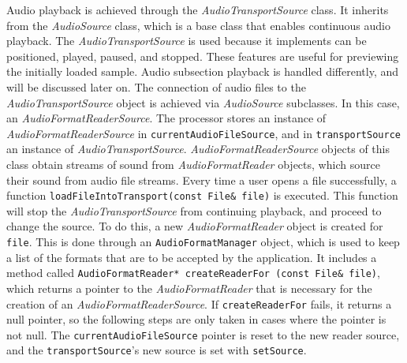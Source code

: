 \documentclass[12pt, a4paper, hidelinks]{article}
\begin{document}
	Audio playback is achieved through the \textit{AudioTransportSource} class. It inherits from the \textit{AudioSource} class, which is a base class that enables continuous audio playback. The \textit{AudioTransportSource} is used because it implements can be positioned, played, paused, and stopped. These features are useful for previewing the initially loaded sample. Audio subsection playback is handled differently, and will be discussed later on. The connection of audio files to the \textit{AudioTransportSource} object is achieved via \textit{AudioSource} subclasses. In this case, an \textit{AudioFormatReaderSource}. The processor stores an instance of \textit{AudioFormatReaderSource} in \texttt{currentAudioFileSource}, and in \texttt{transportSource} an instance of \textit{AudioTransportSource}. \textit{AudioFormatReaderSource} objects of this class obtain streams of sound from \textit{AudioFormatReader} objects, which source their sound from audio file streams. Every time a user opens a file successfully, a function \texttt{loadFileIntoTransport(const File\& file)} is executed. This function will stop the \textit{AudioTransportSource} from continuing playback, and proceed to change the source. To do this, a new \textit{AudioFormatReader} object is created for \texttt{file}. This is done through an \texttt{AudioFormatManager} object, which is used to keep a list of the formats that are to be accepted by the application. It includes a method called \texttt{AudioFormatReader* createReaderFor (const File\& file)}, which returns a pointer to the \textit{AudioFormatReader} that is necessary for the creation of an \textit{AudioFormatReaderSource}. If \texttt{createReaderFor} fails, it returns a null pointer, so the following steps are only taken in cases where the pointer is not null. The \texttt{currentAudioFileSource} pointer is reset to the new reader source, and the \texttt{transportSource}'s new source is set with \texttt{setSource}.\\
\end{document}
